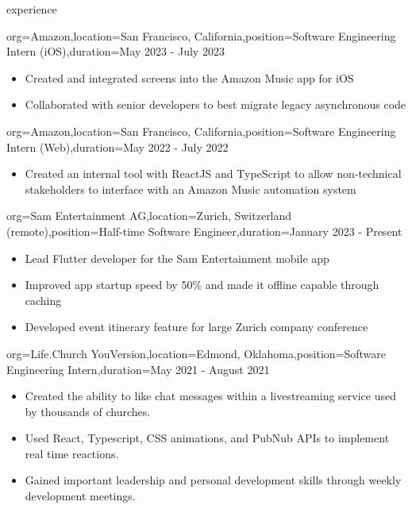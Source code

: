 \documentclass{resume}
\begin{document}
\begin{ResumeSection}{experience}
    \begin{ResumeSubsection}{org={Amazon},location={San Francisco,
        California},position={Software Engineering Intern (iOS)},duration={May 2023 -
    July 2023}}
        \begin{itemize}
            \item Created and integrated screens into the Amazon Music app for iOS
            \item Collaborated with senior developers to best migrate legacy
                asynchronous code
        \end{itemize}
    \end{ResumeSubsection}
    \begin{ResumeSubsection}{org={Amazon},location={San Francisco,
        California},position={Software Engineering Intern (Web)},duration={May 2022 - July 2022}}
        \begin{itemize}
            \item Created an internal tool with ReactJS and TypeScript to allow
                non-technical stakeholders to interface with an Amazon Music automation
                system
        \end{itemize}
    \end{ResumeSubsection}

    \begin{ResumeSubsection}{org={Sam Entertainment AG},location={Zurich,
        Switzerland (remote)},position={Half-time Software Engineer},duration={January
    2023 - Present}}
        \begin{itemize}
            \item Lead Flutter developer for the Sam Entertainment mobile app
            \item Improved app startup speed by 50\% and made it offline capable
                through caching
            \item Developed event itinerary feature for large Zurich company
                conference
        \end{itemize}
    \end{ResumeSubsection}

    \begin{ResumeSubsection}{org={Life.Church YouVersion},location={Edmond, Oklahoma},position={Software Engineering Intern},duration={May 2021 - August 2021}}
        \begin{itemize}
            \item {Created the ability to like chat messages within a livestreaming service used by
                thousands of churches.}
            \item {Used React, Typescript, CSS animations, and
                PubNub APIs to implement real time reactions.}
            \item Gained important leadership and personal development skills
                through weekly development meetings.
        \end{itemize}
    \end{ResumeSubsection}


\end{ResumeSection}
\end{document}
